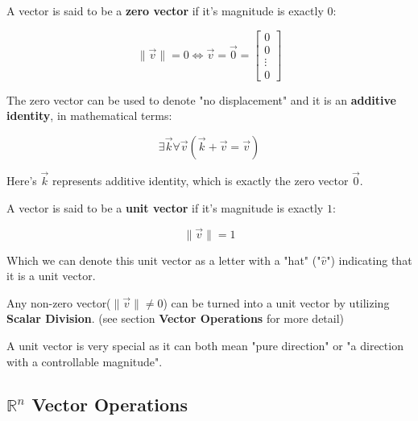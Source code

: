 \sgap
\begin{samepage}
    A vector is said to be a \textbf{zero vector} if it's magnitude is exactly $0$:
    \begin{center}
        \[
            \|\vec{v}\|=0 \iff \vec{v}=\vec{0}=\begin{bmatrix}0 \\ 0 \\ \vdots \\ 0\end{bmatrix}
        \]
    \end{center}

    The zero vector can be used to denote "no displacement" and it is an \textbf{additive identity}, in mathematical terms:
    \begin{center}
        \[
            \exists \vec{k} \forall \vec{v}(\vec{k}+\vec{v}=\vec{v})
        \]
    \end{center}

    Here's $\vec{k}$ represents additive identity, which is exactly the zero vector $\vec{0}$.
\end{samepage}


\sgap

\begin{samepage}
        A vector is said to be a \textbf{unit vector} if it's magnitude is exactly $1$:
        \begin{center}
            \[
                \|\vec{v}\|=1
            \]
        \end{center}

        Which we can denote this unit vector as a letter with a "hat" ("$\hat{v}$") indicating that it is a unit vector.

        Any non-zero vector($\|\vec{v}\| \neq 0$) can be turned into a unit vector by utilizing \textbf{Scalar Division}. (see section \textbf{Vector Operations} for more detail)

        A unit vector is very special as it can both mean "pure direction" or "a direction with a controllable magnitude".
\end{samepage}

\sgap



\subsection{$\mathbb{R}^n$ Vector Operations}

